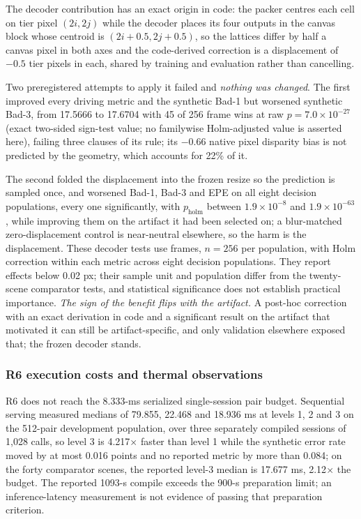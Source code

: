 \documentclass[sigconf,review,anonymous]{acmart}
\begin{document}
The decoder contribution has an exact origin in code: the packer centres each cell on tier pixel $(2i, 2j)$ while the decoder places its four outputs in the canvas block whose centroid is $(2i+0.5, 2j+0.5)$, so the lattices differ by half a canvas pixel in both axes and the code-derived correction is a displacement of $-0.5$ tier pixels in each, shared by training and evaluation rather than cancelling.

Two preregistered attempts to apply it failed and \emph{nothing was changed}. The first improved every driving metric and the synthetic Bad-1 but worsened synthetic Bad-3, from 17.5666 to 17.6704 with 45 of 256 frame wins at raw $p = 7.0\times10^{-27}$ (exact two-sided sign-test value; no familywise Holm-adjusted value is asserted here), failing three clauses of its rule; its $-0.66$ native pixel disparity bias is not predicted by the geometry, which accounts for 22\% of it.

The second folded the displacement into the frozen resize so the prediction is sampled once, and worsened Bad-1, Bad-3 and EPE on all eight decision populations, every one significantly, with $p_{\mathrm{holm}}$ between $1.9\times10^{-8}$ and $1.9\times10^{-63}$, while improving them on the artifact it had been selected on; a blur-matched zero-displacement control is near-neutral elsewhere, so the harm is the displacement. These decoder tests use frames, $n = 256$ per population, with Holm correction within each metric across eight decision populations. They report effects below 0.02 px; their sample unit and population differ from the twenty-scene comparator tests, and statistical significance does not establish practical importance. \emph{The sign of the benefit flips with the artifact.} A post-hoc correction with an exact derivation in code and a significant result on the artifact that motivated it can still be artifact-specific, and only validation elsewhere exposed that; the frozen decoder stands.

\subsubsection{R6 execution costs and thermal observations}
R6 does not reach the 8.333-ms serialized single-session pair budget. Sequential serving measured medians of 79.855, 22.468 and 18.936 ms at levels 1, 2 and 3 on the 512-pair development population, over three separately compiled sessions of 1,028 calls, so level 3 is 4.217$\times$ faster than level 1 while the synthetic error rate moved by at most 0.016 points and no reported metric by more than 0.084; on the forty comparator scenes, the reported level-3 median is 17.677 ms, 2.12$\times$ the budget. The reported 1093-s compile exceeds the 900-s preparation limit; an inference-latency measurement is not evidence of passing that preparation criterion.
\end{document}
